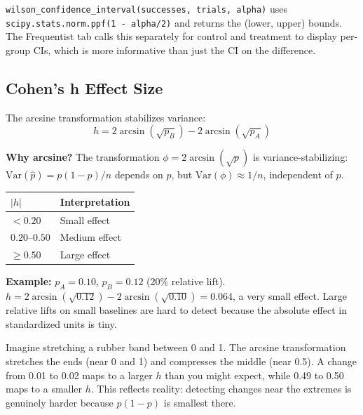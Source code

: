 \documentclass[11pt,a4paper]{article}
\newcommand{\code}[1]{\texttt{#1}}
\newcommand{\scipy}[1]{\texttt{scipy.stats.#1}}
\begin{document}
\vspace{8pt}

\begin{application}
\code{wilson\_confidence\_interval(successes, trials, alpha)} uses \scipy{norm.ppf(1 - alpha/2)} and returns the (lower, upper) bounds. The Frequentist tab calls this separately for control and treatment to display per-group CIs, which is more informative than just the CI on the difference.
\end{application}

\subsection{Cohen's h Effect Size}

\begin{formaldef}
The arcsine transformation stabilizes variance:
\[
h = 2\arcsin\!\left(\sqrt{p_B}\right) - 2\arcsin\!\left(\sqrt{p_A}\right)
\]

\textbf{Why arcsine?} The transformation $\phi = 2\arcsin(\sqrt{p})$ is variance-stabilizing: $\mathrm{Var}(\hat{p}) = p(1-p)/n$ depends on $p$, but $\mathrm{Var}(\phi) \approx 1/n$, independent of $p$.

\medskip
\begin{tabular}{@{}ll@{}}
\toprule
$|h|$ & Interpretation \\
\midrule
$< 0.20$ & Small effect \\
$0.20$--$0.50$ & Medium effect \\
$\geq 0.50$ & Large effect \\
\bottomrule
\end{tabular}

\medskip
\textbf{Example:} $p_A = 0.10$, $p_B = 0.12$ (20\% relative lift). $h = 2\arcsin(\sqrt{0.12}) - 2\arcsin(\sqrt{0.10}) = 0.064$, a very small effect. Large relative lifts on small baselines are hard to detect because the absolute effect in standardized units is tiny.
\end{formaldef}

\vspace{8pt}

\begin{intuition}
Imagine stretching a rubber band between 0 and 1. The arcsine transformation stretches the ends (near 0 and 1) and compresses the middle (near 0.5). A change from 0.01 to 0.02 maps to a larger $h$ than you might expect, while 0.49 to 0.50 maps to a smaller $h$. This reflects reality: detecting changes near the extremes is genuinely harder because $p(1-p)$ is smallest there.
\end{intuition}
\end{document}
